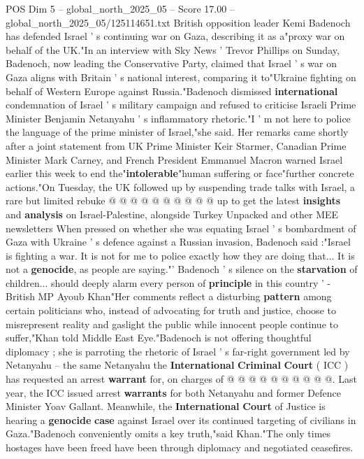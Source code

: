 \begin{textsample}{POS Dim 5 – global\_north\_2025\_05 – Score 17.00 – global\_north\_2025\_05/125114651.txt}  \label{ex:f5_pos_079}
British opposition leader Kemi Badenoch has defended Israel ' s continuing war on Gaza, describing it as a"proxy war on behalf of the UK."In an interview with Sky News ' Trevor Phillips on Sunday, Badenoch, now leading the Conservative Party, claimed that Israel ' s war on Gaza aligns with Britain ' s national interest, comparing it to"Ukraine fighting on behalf of Western Europe against Russia."Badenoch dismissed \textbf{international} condemnation of Israel ' s military campaign and refused to criticise Israeli Prime Minister Benjamin Netanyahu ' s inflammatory rhetoric."I ' m not here to police the language of the prime minister of Israel,"she said.
Her remarks came shortly after a joint statement from UK Prime Minister Keir Starmer, Canadian Prime Minister Mark Carney, and French President Emmanuel Macron warned Israel earlier this week to end the"\textbf{intolerable}"human suffering or face"further concrete actions."On Tuesday, the UK followed up by suspending trade talks with Israel, a rare but limited rebuke @ @ @ @ @ @ @ @ @ @ up to get the latest \textbf{insights} and \textbf{analysis} on Israel-Palestine, alongside Turkey Unpacked and other MEE newsletters When pressed on whether she was equating Israel ' s bombardment of Gaza with Ukraine ' s defence against a Russian invasion, Badenoch said :"Israel is fighting a war.
It is not for me to police exactly how they are doing that...
It is not a \textbf{genocide}, as people are saying."' Badenoch ' s silence on the \textbf{starvation} of children... should deeply alarm every person of \textbf{principle} in this country ' - British MP Ayoub Khan"Her comments reflect a disturbing \textbf{pattern} among certain politicians who, instead of advocating for truth and justice, choose to misrepresent reality and gaslight the public while innocent people continue to suffer,"Khan told Middle East Eye."Badenoch is not offering thoughtful diplomacy ; she is parroting the rhetoric of Israel ' s far-right government led by Netanyahu -- the same Netanyahu the \textbf{International} \textbf{Criminal} \textbf{Court} ( ICC ) has requested an arrest \textbf{warrant} for, on charges of @ @ @ @ @ @ @ @ @ @.
Last year, the ICC issued arrest \textbf{warrants} for both Netanyahu and former Defence Minister Yoav Gallant.
Meanwhile, the \textbf{International} \textbf{Court} of Justice is hearing a \textbf{genocide} \textbf{case} against Israel over its continued targeting of civilians in Gaza."Badenoch conveniently omits a key truth,"said Khan."The only times hostages have been freed have been through diplomacy and negotiated ceasefires.

\end{textsample}
